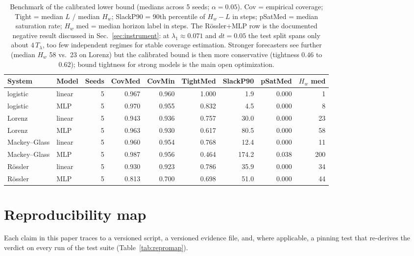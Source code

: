 \documentclass[aps,pre,twocolumn,superscriptaddress,nofootinbib,longbibliography]{revtex4-2}
\newcommand{\Hw}{H_w}
\newcommand{\Tlyap}{T_\lambda}
\begin{document}
\begin{table}[t]
  \centering
  \begin{tabular}{l l r r r r r r r}
    \toprule
    System & Model & Seeds & CovMed & CovMin & TightMed & SlackP90 & pSatMed & $\Hw$ med \\
    \midrule
    logistic & linear & 5 & 0.967 & 0.960 & 1.000 & 1.9 & 0.000 & 1 \\
    logistic & MLP & 5 & 0.970 & 0.955 & 0.832 & 4.5 & 0.000 & 8 \\
    Lorenz & linear & 5 & 0.943 & 0.936 & 0.757 & 30.0 & 0.000 & 23 \\
    Lorenz & MLP & 5 & 0.963 & 0.930 & 0.617 & 80.5 & 0.000 & 58 \\
    Mackey--Glass & linear & 5 & 0.960 & 0.954 & 0.768 & 12.4 & 0.000 & 11 \\
    Mackey--Glass & MLP & 5 & 0.987 & 0.956 & 0.464 & 174.2 & 0.038 & 200 \\
    R\"ossler & linear & 5 & 0.930 & 0.923 & 0.786 & 35.9 & 0.000 & 34 \\
    R\"ossler & MLP & 5 & 0.813 & 0.700 & 0.698 & 51.0 & 0.000 & 44 \\
    \bottomrule
  \end{tabular}
  \caption{Benchmark of the calibrated lower bound (medians across 5
  seeds; $\alpha = 0.05$). Cov = empirical coverage; Tight = median $L$ /
  median $\Hw$; SlackP90 = 90th percentile of $\Hw - L$ in steps; pSatMed
  = median saturation rate; $\Hw$ med = median horizon label in steps.
  The R\"ossler+MLP row is the documented negative result discussed in
  Sec.~\ref{sec:instrument}: at $\lambda_1 \approx 0.071$ and $dt = 0.05$
  the test split spans only about $4\,\Tlyap$, too few independent
  regimes for stable coverage estimation. Stronger forecasters see
  further (median $\Hw$ 58 vs.\ 23 on Lorenz) but the calibrated bound is
  then more conservative (tightness $0.46$ to $0.62$); bound tightness
  for strong models is the main open optimization.}
  \label{tab:benchmark}
\end{table}

\section{Reproducibility map}
\label{app:repromap}

Each claim in this paper traces to a versioned script, a versioned
evidence file, and, where applicable, a pinning test that re-derives the
verdict on every run of the test suite (Table~\ref{tab:repromap}).
\end{document}
